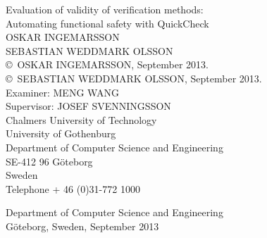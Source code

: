 {\setlength{\parindent}{0cm}


  {\Large Evaluation of validity of verification methods:}\\
  {\large Automating functional safety with QuickCheck}\\

  {OSKAR INGEMARSSON}\\
  {SEBASTIAN WEDDMARK OLSSON}\\

  \copyright ~OSKAR INGEMARSSON, September 2013.\\
  \copyright ~SEBASTIAN WEDDMARK OLSSON, September 2013.\\

  Examiner: MENG WANG\\
  Supervisor: JOSEF SVENNINGSSON\\

  Chalmers University of Technology\\
  University of Gothenburg\\
  Department of Computer Science and Engineering\\
  SE-412 96 G\"{o}teborg\\
  Sweden\\
  Telephone + 46 (0)31-772 1000\\
  \vfill

  Department of Computer Science and Engineering\\
  G\"{o}teborg, Sweden, September 2013
}
\newpage
{}
